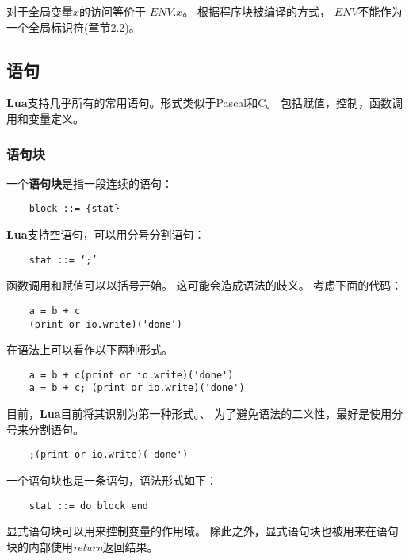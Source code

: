 \documentclass{ctexart}
\begin{document}
对于全局变量$x$的访问等价于$\_ENV.x$。
根据程序块被编译的方式，$\_ENV$不能作为一个全局标识符(章节2.2)。

\subsection{语句}

\textbf{Lua}支持几乎所有的常用语句。形式类似于Pascal和C。
包括赋值，控制，函数调用和变量定义。

\subsubsection{语句块}

一个\textbf{语句块}是指一段连续的语句：
\lstset{language=C}
\begin{lstlisting}
	block ::= {stat}
\end{lstlisting}

\textbf{Lua}支持空语句，可以用分号分割语句：

\lstset{language=C}
\begin{lstlisting}
	stat ::= ‘;’
\end{lstlisting}

函数调用和赋值可以以括号开始。
这可能会造成语法的歧义。
考虑下面的代码：

\lstset{language=C}
\begin{lstlisting}
	a = b + c
	(print or io.write)('done')
\end{lstlisting}

在语法上可以看作以下两种形式。

\lstset{language=C}
\begin{lstlisting}
	a = b + c(print or io.write)('done') 
	a = b + c; (print or io.write)('done')
\end{lstlisting}

目前，\textbf{Lua}目前将其识别为第一种形式。、
为了避免语法的二义性，最好是使用分号来分割语句。

\lstset{language=C}
\begin{lstlisting}
	;(print or io.write)('done')
\end{lstlisting}

一个语句块也是一条语句，语法形式如下：

\lstset{language=C}
\begin{lstlisting}
	stat ::= do block end
\end{lstlisting}

显式语句块可以用来控制变量的作用域。
除此之外，显式语句块也被用来在语句块的内部使用\emph{return}返回结果。
\end{document}

